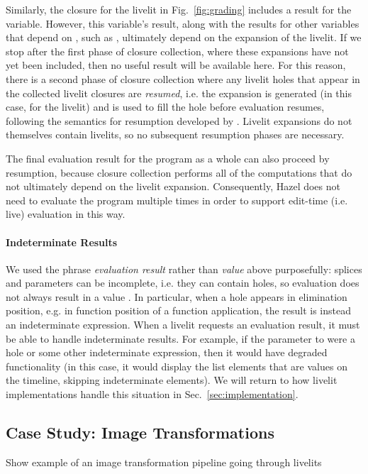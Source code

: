 Similarly, the closure for the  livelit in Fig.~\ref{fig:grading} includes a result for 
the  variable. However, this variable's result, along with the 
results for other variables that depend on , such as , ultimately depend on the 
expansion of the  livelit. If we stop after the first phase of closure collection,
where these expansions have not yet been included, 
then no useful result will be available here.
For this reason, there is a second phase of closure collection where any livelit holes that appear 
in the collected livelit closures are \emph{resumed}, i.e. the expansion is generated 
(in this case, for the  livelit) and is used to fill 
the hole before evaluation resumes, following the semantics for resumption developed by \citet{HazelnutLive}.
Livelit expansions do not themselves contain livelits, so no subsequent resumption phases are necessary.

The final evaluation result for the program as a whole can also proceed by resumption, because 
closure collection performs all of the computations that do not ultimately depend on the livelit expansion.
Consequently, Hazel does not need to evaluate the program multiple times in order to support edit-time 
(i.e. live) evaluation in this way.

\paragraph{Indeterminate Results}
We used the phrase \emph{evaluation result} rather than \emph{value} above purposefully: 
splices and parameters can be incomplete, i.e. they can contain holes, so 
evaluation does not always result in a value \cite{HazelnutLive}.
In particular, when a hole appears in elimination position, e.g. in function position of a function application,
 the result is instead an indeterminate expression. 
When a livelit requests an evaluation result, it must be able to handle indeterminate results.
For example, if the parameter to  were a hole or some other indeterminate expression, 
then it would have degraded functionality 
(in this case, it would display the list elements that are values on the timeline, skipping indeterminate elements). 
We will return to how livelit implementations handle this situation in Sec.~\ref{sec:implementation}.

\subsection{Case Study: Image Transformations}\label{sec:image-transformation}
Show example of an image transformation pipeline going through livelits

